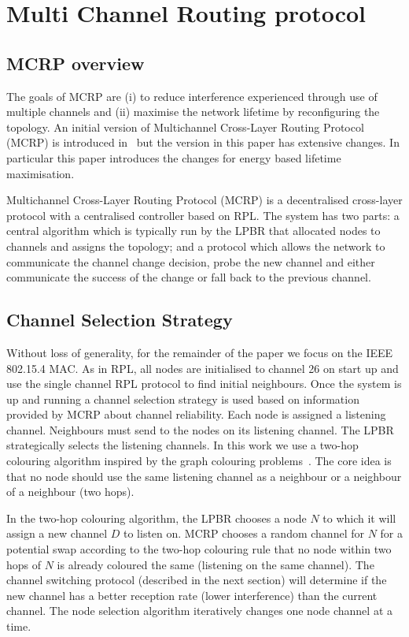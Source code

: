 \section{Multi Channel Routing protocol}
\label{MCRP}

\subsection{MCRP overview}
The goals of MCRP are (i) to reduce interference experienced through use of multiple channels and (ii) maximise the network lifetime by reconfiguring the topology. 
An initial version of Multichannel Cross-Layer Routing Protocol (MCRP) is introduced in~\cite{mcrp} but the version in this paper has extensive changes.  In particular this paper introduces the changes for energy based lifetime maximisation.

Multichannel Cross-Layer Routing Protocol (MCRP) \cite{mcrp} is a decentralised cross-layer protocol with a centralised controller based on RPL.  The system has two parts: a central algorithm which is typically run by the LPBR that allocated nodes to channels and assigns the topology; and a protocol which allows the network to communicate the channel change decision, probe the new channel and either communicate the success of the change or fall back to the previous channel. 

\subsection{Channel Selection Strategy}
Without loss of generality, for the remainder of the paper we focus on the IEEE 802.15.4 MAC. As in RPL, all nodes are initialised to channel 26 on start up and use the single channel RPL protocol to find initial neighbours.  Once the system is up and running a channel selection strategy is used based on information provided by MCRP about channel reliability.  Each node is assigned a listening channel.  Neighbours must send to the nodes on its listening channel.  The LPBR strategically selects the listening channels.  In this work we use a two-hop colouring algorithm inspired by the graph colouring problems~\cite{graphColouring}. The core idea is that no node should use the same listening channel as a neighbour or a neighbour of a neighbour (two hops).

In the two-hop colouring algorithm, the LPBR chooses a node $N$ to which it will assign a new channel $D$ to listen on.  MCRP chooses a random channel for $N$ for a potential swap according to the two-hop colouring rule that no node within two hops of $N$ is already coloured the same (listening on the same channel).  The channel switching protocol (described in the next section) will determine if the new channel has a better reception rate (lower interference) than the current channel.  The node selection algorithm iteratively changes one node channel at a time. 



